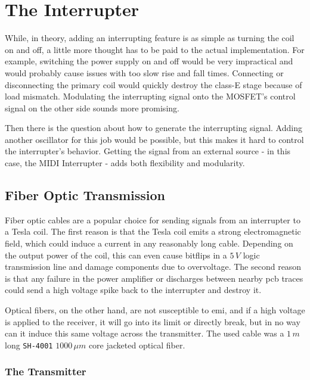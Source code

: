 \section{The Interrupter}

While, in theory, adding an interrupting feature is as simple as turning the coil on and off, a little more thought has to be paid to the actual implementation. For example, switching the power supply on and off would be very impractical and would probably cause issues with too slow rise and fall times. Connecting or disconnecting the primary coil would quickly destroy the class-E stage because of load mismatch. Modulating the interrupting signal onto the MOSFET's control signal on the other side sounds more promising.

Then there is the question about how to generate the interrupting signal. Adding another oscillator for this job would be possible, but this makes it hard to control the interrupter's behavior. Getting the signal from an external source - in this case, the MIDI Interrupter - adds both flexibility and modularity.

\subsection{Fiber Optic Transmission}

Fiber optic cables are a popular choice for sending signals from an interrupter to a Tesla coil. The first reason is that the Tesla coil emits a strong electromagnetic field, which could induce a current in any reasonably long cable. Depending on the output power of the coil, this can even cause bitflips in a \(5\,V\) logic transmission line and damage components due to overvoltage. The second reason is that any failure in the power amplifier or discharges between nearby \gls{pcb} traces could send a high voltage spike back to the interrupter and destroy it.

Optical fibers, on the other hand, are not susceptible to \gls{emi}, and if a high voltage is applied to the receiver, it will go into its limit or directly break, but in no way can it induce this same voltage across the transmitter. The used cable was a \(1\,m\) long \texttt{SH-4001} \(1000\,\mu m\) core jacketed optical fiber.

\subsubsection{The Transmitter}

